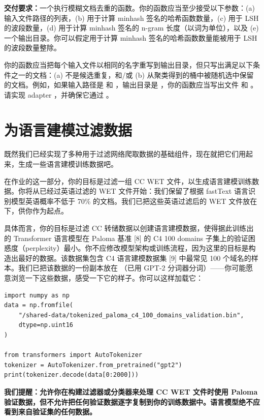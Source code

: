 \textbf{交付要求：}一个执行模糊文档去重的函数。你的函数应当至少接受以下参数：(a) 输入文件路径的列表，(b) 用于计算 minhash 签名的哈希函数数量，(c) 用于 LSH 的波段数量，(d) 用于计算 minhash 签名的 n-gram 长度（以词为单位），以及 (e) 一个输出目录。你可以假定用于计算 minhash 签名的哈希函数数量能被用于 LSH 的波段数量整除。

你的函数应当把每个输入文件以相同的名字重写到输出目录，但只写出满足以下条件之一的文档：(a) 不是候选重复，和/或 (b) 从聚类得到的桶中被随机选中保留的文档。例如，如果输入路径是  和 ，输出目录是 ，你的函数应当写出文件  和 。请实现 adapter ，并确保它通过 。

\section{为语言建模过滤数据}

既然我们已经实现了多种用于过滤网络爬取数据的基础组件，现在就把它们用起来，生成一些语言建模训练数据吧。

在作业的这一部分，你的目标是过滤一组 CC WET 文件，以生成语言建模训练数据。你将从已经过英语过滤的 WET 文件开始：我们保留了根据 fastText  语言识别模型英语概率不低于 70\% 的文档。我们已把这些英语过滤后的 WET 文件放在  下，供你作为起点。

具体而言，你的目标是过滤 CC 转储数据以创建语言建模数据，使得据此训练出的 Transformer 语言模型在 Paloma 基准 [8] 的 C4 100 domains 子集上的验证困惑度（perplexity）最小。你不应修改模型架构或训练流程，因为这里的目标是构造出最好的数据。该数据集包含 C4 语言建模数据集 [9] 中最常见 100 个域名的样本。我们已把该数据的一份副本放在 （已用 GPT-2 分词器分词）——你可能愿意浏览一下这些数据，感受一下它的样子。你可以这样加载它：

\begin{lstlisting}
import numpy as np
data = np.fromfile(
    "/shared-data/tokenized_paloma_c4_100_domains_validation.bin",
    dtype=np.uint16
)

from transformers import AutoTokenizer
tokenizer = AutoTokenizer.from_pretrained("gpt2")
print(tokenizer.decode(data[0:2000]))
\end{lstlisting}

\textbf{我们提醒：允许你在构建过滤器或分类器来处理 CC WET 文件时使用 Paloma 验证数据，但不允许把任何验证数据逐字复制到你的训练数据中。语言模型绝不应看到来自验证集的任何数据。}

